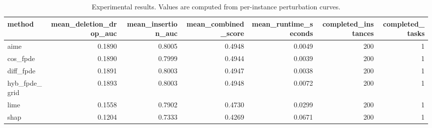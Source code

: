 \begin{table}[t]
\caption{Experimental results. Values are computed from per-instance perturbation curves.}
\label{tab:main_results_computed}
\centering
\begin{tabular}{lrrrrrr}
\toprule
method & mean\_deletion\_drop\_auc & mean\_insertion\_auc & mean\_combined\_score & mean\_runtime\_seconds & completed\_instances & completed\_tasks \\
\midrule
aime & 0.1890 & 0.8005 & 0.4948 & 0.0049 & 200 & 1 \\
cos\_fpde & 0.1890 & 0.7999 & 0.4944 & 0.0039 & 200 & 1 \\
diff\_fpde & 0.1891 & 0.8003 & 0.4947 & 0.0038 & 200 & 1 \\
hyb\_fpde\_grid & 0.1893 & 0.8003 & 0.4948 & 0.0072 & 200 & 1 \\
lime & 0.1558 & 0.7902 & 0.4730 & 0.0299 & 200 & 1 \\
shap & 0.1204 & 0.7333 & 0.4269 & 0.0671 & 200 & 1 \\
\bottomrule
\end{tabular}

\end{table}
